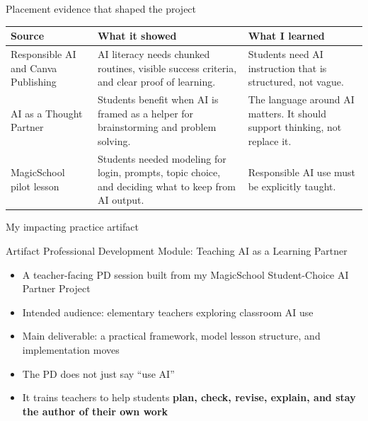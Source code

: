 \documentclass[aspectratio=169,11pt]{beamer}
\begin{document}
\begin{frame}{Placement evidence that shaped the project}
\small
\begin{tabularx}{\textwidth}{@{}p{3.4cm}YY@{}}
\toprule
\textbf{Source} & \textbf{What it showed} & \textbf{What I learned} \\
\midrule
Responsible AI and Canva Publishing & AI literacy needs chunked routines, visible success criteria, and clear proof of learning. & Students need AI instruction that is structured, not vague. \\
\addlinespace
AI as a Thought Partner & Students benefit when AI is framed as a helper for brainstorming and problem solving. & The language around AI matters. It should support thinking, not replace it. \\
\addlinespace
MagicSchool pilot lesson & Students needed modeling for login, prompts, topic choice, and deciding what to keep from AI output. & Responsible AI use must be explicitly taught. \\
\bottomrule
\end{tabularx}
\end{frame}

\begin{frame}{My impacting practice artifact}
\begin{block}{Artifact}
\Large Professional Development Module: Teaching AI as a Learning Partner
\end{block}

\vspace{0.25cm}
\begin{itemize}
  \item A teacher-facing PD session built from my MagicSchool Student-Choice AI Partner Project
  \item Intended audience: elementary teachers exploring classroom AI use
  \item Main deliverable: a practical framework, model lesson structure, and implementation moves
  \item The PD does not just say ``use AI''
  \item It trains teachers to help students \textbf{plan, check, revise, explain, and stay the author of their own work}
\end{itemize}
\end{frame}
\end{document}
